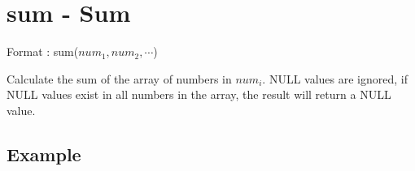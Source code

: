 
%

\section{sum - Sum\label{sect:sum}}

Format : sum($num_1,num_2,\cdots$)

Calculate the sum of the array of numbers in $num_i$.
NULL values are ignored, if NULL values exist in all numbers in the array, the result will return a NULL value.

\subsection*{Example}


%

